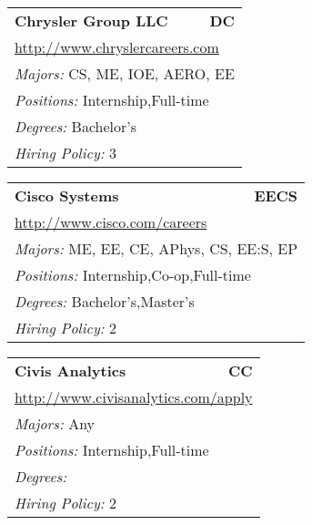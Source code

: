 \documentclass[twoside]{article}
\begin{document}
\begin{center}
\begin{multicols}{3}
\begin{FlushLeft}
\begin{minipage}{.9\columnwidth}
\end{minipage}
 
\begin{minipage}{.9\columnwidth}\begin{tabularx}{.95\columnwidth}{Xr}
                 {\Large\bf Chrysler Group LLC} & {\Large\bf DC}\\
    \multicolumn{2}{p{.95\columnwidth}}{\url{http://www.chryslercareers.com}}\\
    \multicolumn{2}{p{.95\columnwidth}}{\emph{Majors:} CS, ME, IOE, AERO, EE}\\
    \multicolumn{2}{p{.95\columnwidth}}{\emph{Positions:} Internship,Full-time}\\
    \multicolumn{2}{p{.95\columnwidth}}{\emph{Degrees:} Bachelor's}\\
    \multicolumn{2}{p{.95\columnwidth}}{\emph{Hiring Policy:} 3}\\
    \end{tabularx}
    
\end{minipage}
 
\begin{minipage}{.9\columnwidth}\begin{tabularx}{.95\columnwidth}{Xr}
                 {\Large\bf Cisco Systems} & {\Large\bf EECS}\\
    \multicolumn{2}{p{.95\columnwidth}}{\url{http://www.cisco.com/careers}}\\
    \multicolumn{2}{p{.95\columnwidth}}{\emph{Majors:} ME, EE, CE, APhys, CS, EE:S, EP}\\
    \multicolumn{2}{p{.95\columnwidth}}{\emph{Positions:} Internship,Co-op,Full-time}\\
    \multicolumn{2}{p{.95\columnwidth}}{\emph{Degrees:} Bachelor's,Master's}\\
    \multicolumn{2}{p{.95\columnwidth}}{\emph{Hiring Policy:} 2}\\
    \end{tabularx}
    
\end{minipage}
 
\begin{minipage}{.9\columnwidth}\begin{tabularx}{.95\columnwidth}{Xr}
                 {\Large\bf Civis Analytics} & {\Large\bf CC}\\
    \multicolumn{2}{p{.95\columnwidth}}{\url{http://www.civisanalytics.com/apply}}\\
    \multicolumn{2}{p{.95\columnwidth}}{\emph{Majors:} Any}\\
    \multicolumn{2}{p{.95\columnwidth}}{\emph{Positions:} Internship,Full-time}\\
    \multicolumn{2}{p{.95\columnwidth}}{\emph{Degrees:} }\\
    \multicolumn{2}{p{.95\columnwidth}}{\emph{Hiring Policy:} 2}\\
    \end{tabularx}
    

\end{minipage}
\end{FlushLeft}
\end{multicols}
\end{center}
\end{document}

